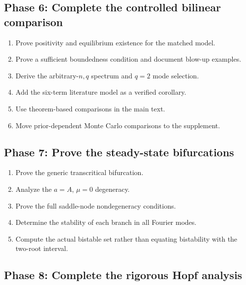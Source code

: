 \documentclass[11pt, reqno]{amsart}
\theoremstyle{definition}
\theoremstyle{remark}
\begin{document}
	\subsection{Phase 6: Complete the controlled bilinear comparison}
	
	\begin{enumerate}[label=6.\arabic*,leftmargin=3em]
		\item Prove positivity and equilibrium existence for the matched model.
		\item Prove a sufficient boundedness condition and document blow-up
		examples.
		\item Derive the arbitrary-$n,q$ spectrum and $q=2$ mode selection.
		\item Add the six-term literature model as a verified corollary.
		\item Use theorem-based comparisons in the main text.
		\item Move prior-dependent Monte Carlo comparisons to the supplement.
	\end{enumerate}
	
	\subsection{Phase 7: Prove the steady-state bifurcations}
	
	\begin{enumerate}[label=7.\arabic*,leftmargin=3em]
		\item Prove the generic transcritical bifurcation.
		\item Analyze the $a=A$, $\mu=0$ degeneracy.
		\item Prove the full saddle-node nondegeneracy conditions.
		\item Determine the stability of each branch in all Fourier modes.
		\item Compute the actual bistable set rather than equating bistability with
		the two-root interval.
	\end{enumerate}
	
	\subsection{Phase 8: Complete the rigorous Hopf analysis}
	
\end{document}
